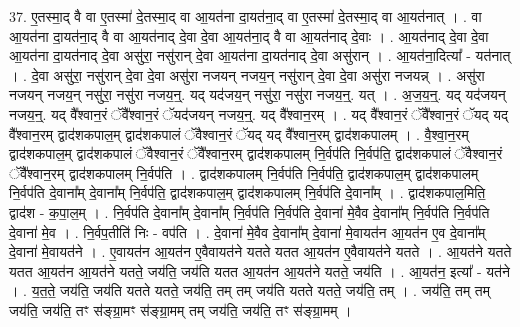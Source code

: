 \documentclass[17pt]{extarticle}
\begin{document}
37. ए॒तस्मा॒द् वै वा ए॒तस्मा॑ दे॒तस्मा॒द् वा आ॒यत॑ना दा॒यत॑ना॒द् वा ए॒तस्मा॑ दे॒तस्मा॒द् वा आ॒यत॑नात् । . वा आ॒यत॑ना दा॒यत॑ना॒द् वै वा आ॒यत॑नाद् दे॒वा दे॒वा आ॒यत॑ना॒द् वै वा आ॒यत॑नाद् दे॒वाः । . आ॒यत॑नाद् दे॒वा दे॒वा आ॒यत॑ना दा॒यत॑नाद् दे॒वा असु॑रा॒ नसु॑रान् दे॒वा आ॒यत॑ना दा॒यत॑नाद् दे॒वा असु॑रान् । . आ॒यत॑ना॒दित्या᳚ - यत॑नात् । . दे॒वा असु॑रा॒ नसु॑रान् दे॒वा दे॒वा असु॑रा नजयन् नजय॒न् नसु॑रान् दे॒वा दे॒वा असु॑रा नजयन्न् । . असु॑रा नजयन् नजय॒न् नसु॑रा॒ नसु॑रा नजय॒न्॒. यद् यद॑जय॒न् नसु॑रा॒ नसु॑रा नजय॒न्॒. यत् । . अ॒ज॒य॒न्॒. यद् यद॑जयन् नजय॒न्॒. यद् वै᳚श्वान॒रं ॅवै᳚श्वान॒रं ॅयद॑जयन् नजय॒न्॒. यद् वै᳚श्वान॒रम् । . यद् वै᳚श्वान॒रं ॅवै᳚श्वान॒रं ॅयद् यद् वै᳚श्वान॒रम् द्वाद॑शकपाल॒म् द्वाद॑शकपालं ॅवैश्वान॒रं ॅयद् यद् वै᳚श्वान॒रम् द्वाद॑शकपालम् । . वै॒श्वा॒न॒रम् द्वाद॑शकपाल॒म् द्वाद॑शकपालं ॅवैश्वान॒रं ॅवै᳚श्वान॒रम् द्वाद॑शकपालम् नि॒र्वप॑ति नि॒र्वप॑ति॒ द्वाद॑शकपालं ॅवैश्वान॒रं ॅवै᳚श्वान॒रम् द्वाद॑शकपालम् नि॒र्वप॑ति । . द्वाद॑शकपालम् नि॒र्वप॑ति नि॒र्वप॑ति॒ द्वाद॑शकपाल॒म् द्वाद॑शकपालम् नि॒र्वप॑ति दे॒वाना᳚म् दे॒वाना᳚म् नि॒र्वप॑ति॒ द्वाद॑शकपाल॒म् द्वाद॑शकपालम् नि॒र्वप॑ति दे॒वाना᳚म् । . द्वाद॑शकपाल॒मिति॒ द्वाद॑श - क॒पा॒ल॒म् । . नि॒र्वप॑ति दे॒वाना᳚म् दे॒वाना᳚म् नि॒र्वप॑ति नि॒र्वप॑ति दे॒वाना॑ मे॒वैव दे॒वाना᳚म् नि॒र्वप॑ति नि॒र्वप॑ति दे॒वाना॑ मे॒व । . नि॒र्वप॒तीति॑ निः - वप॑ति । . दे॒वाना॑ मे॒वैव दे॒वाना᳚म् दे॒वाना॑ मे॒वायत॑न आ॒यत॑न ए॒व दे॒वाना᳚म् दे॒वाना॑ मे॒वायत॑ने । . ए॒वायत॑न आ॒यत॑न ए॒वैवायत॑ने यतते यतत आ॒यत॑न ए॒वैवायत॑ने यतते । . आ॒यत॑ने यतते यतत आ॒यत॑न आ॒यत॑ने यतते॒ जय॑ति॒ जय॑ति यतत आ॒यत॑न आ॒यत॑ने यतते॒ जय॑ति । . आ॒यत॑न॒ इत्या᳚ - यत॑ने । . य॒त॒ते॒ जय॑ति॒ जय॑ति यतते यतते॒ जय॑ति॒ तम् तम् जय॑ति यतते यतते॒ जय॑ति॒ तम् । . जय॑ति॒ तम् तम् जय॑ति॒ जय॑ति॒ तꣳ स॑ङ्ग्रा॒मꣳ स॑ङ्ग्रा॒मम् तम् जय॑ति॒ जय॑ति॒ तꣳ स॑ङ्ग्रा॒मम् । \newline
\end{document}
